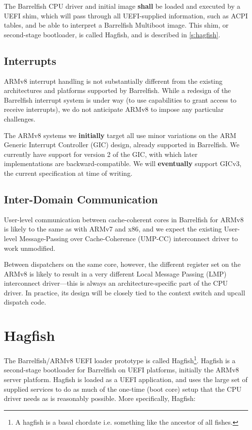 \documentclass[a4paper,twoside]{report}
\begin{document}
The Barrelfish CPU driver and initial image \textbf{shall} be loaded and
executed by a UEFI shim, which will pass through all UEFI-supplied
information, such as ACPI tables, and be able to interpret a Barrelfish
Multiboot image.  This shim, or second-stage bootloader, is called Hagfish,
and is described in \autoref{s:hagfish}.

\subsection{Interrupts}

ARMv8 interrupt handling is not substantially different from the existing
architectures and platforms supported by Barrelfish. While a redesign of the
Barrelfish interrupt system is under way (to use capabilities to grant access
to receive interrupts), we do not anticipate ARMv8 to impose any particular
challenges.

The ARMv8 systems we \textbf{initially} target all use minor variations on the
ARM Generic Interrupt Controller (GIC) design, already supported in
Barrelfish. We currently have support for version 2 of the GIC, with which
later implementations are backward-compatible. We will \textbf{eventually}
support GICv3, the current specification at time of writing.

\subsection{Inter-Domain Communication}

User-level communication between cache-coherent cores in Barrelfish for ARMv8
is likely to the same as with ARMv7 and x86, and we expect the existing
User-level Message-Passing over Cache-Coherence (UMP-CC) interconnect driver
to work unmodified.

Between dispatchers on the same core, however, the different register set on
the ARMv8 is likely to result in a very different Local Message Passing (LMP)
interconnect driver---this is always an architecture-specific part of the CPU
driver. In practice, its design will be closely tied to the context switch and
upcall dispatch code.

\section{Hagfish}\label{s:hagfish}

The Barrelfish/ARMv8 UEFI loader prototype is called Hagfish\footnote{A
hagfish is a basal chordate i.e. something like the ancestor of all fishes.}.
Hagfish is a second-stage bootloader for Barrelfish on UEFI platforms,
initially the ARMv8 server platform.  Hagfish is loaded as a UEFI application,
and uses the large set of supplied services to do as much of the one-time
(boot core) setup that the CPU driver needs as is reasonably possible. More
specifically, Hagfish:
\end{document}
